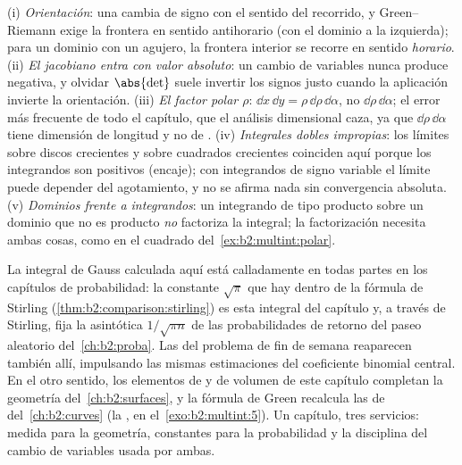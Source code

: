\begin{remark}
(i) \emph{Orientación}: una  cambia de signo con
el sentido del recorrido, y Green--Riemann exige la frontera en
sentido antihorario (con el dominio a la izquierda); para un dominio
con un agujero, la frontera interior se recorre en sentido
\emph{horario}. (ii) \emph{El jacobiano entra con valor absoluto}: un
cambio de variables nunca produce  negativa, y olvidar
$\abs{\det}$ suele invertir los signos justo cuando la aplicación
invierte la orientación. (iii) \emph{El factor polar $\rho$}: $\dd
x\,\dd y = \rho\,\dd\rho\,\dd\alpha$, no $\dd\rho\,\dd\alpha$; el
error más frecuente de todo el capítulo, que el análisis dimensional
caza, ya que $\dd\rho\,\dd\alpha$ tiene dimensión de longitud y no de
. (iv) \emph{Integrales dobles impropias}: los límites sobre
discos crecientes y sobre cuadrados crecientes coinciden aquí porque
los integrandos son positivos (encaje); con integrandos de signo
variable el límite puede depender del agotamiento, y no se afirma
nada sin convergencia absoluta. (v) \emph{Dominios frente a
integrandos}: un integrando de tipo producto sobre un dominio que no
es producto \emph{no} factoriza la integral; la factorización
necesita ambas cosas, como en el cuadrado del~\cref{ex:b2:multint:polar}.
\end{remark}

\begin{remark}
La integral de Gauss calculada aquí está calladamente en todas partes
en los capítulos de probabilidad: la constante $\sqrt\pi$ que hay
dentro de la fórmula de Stirling
(\cref{thm:b2:comparison:stirling}) es esta integral del capítulo y,
a través de Stirling, fija la asintótica $1/\sqrt{\pi n}$ de las
probabilidades de retorno del paseo aleatorio del~\cref{ch:b2:proba}. Las  del problema de fin de
semana reaparecen también allí, impulsando las mismas estimaciones
del coeficiente binomial central. En el otro sentido, los elementos
de  y de volumen de este capítulo completan la geometría del~\cref{ch:b2:surfaces}, y la fórmula de Green recalcula las  de
 del~\cref{ch:b2:curves} (la , en el~\cref{exo:b2:multint:5}). Un capítulo, tres servicios: medida para la
geometría, constantes para la probabilidad y la disciplina del cambio
de variables usada por ambas.
\end{remark}

